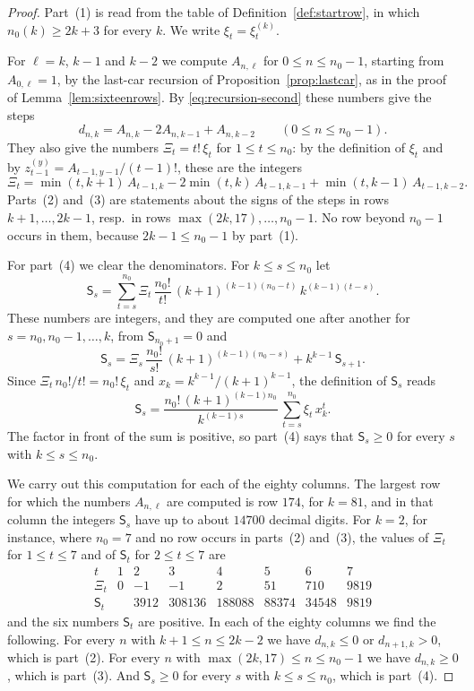 \documentclass{amsart}
\theoremstyle{definition}
\theoremstyle{remark}
\numberwithin{equation}{section}
\begin{document}
\begin{proof}
Part~(1) is read from the table of Definition~\ref{def:startrow}, in which $n_0(k)\ge 2k+3$ for every $k$. We write $\xi_t=\xi^{(k)}_t$.

For $\ell=k$, $k-1$ and $k-2$ we compute $A_{n,\ell}$ for $0\le n\le n_0-1$, starting from $A_{0,\ell}=1$, by the last-car recursion of Proposition~\ref{prop:lastcar}, as in the proof of Lemma~\ref{lem:sixteenrows}. By \eqref{eq:recursion-second} these numbers give the steps
\[
d_{n,k}=A_{n,k}-2A_{n,k-1}+A_{n,k-2}\qquad(0\le n\le n_0-1).
\]
They also give the numbers $\Xi_t=t!\,\xi_t$ for $1\le t\le n_0$: by the definition of $\xi_t$ and by $z^{(y)}_{t-1}=A_{t-1,y-1}/(t-1)!$, these are the integers
\[
\Xi_t=\min(t,k+1)\,A_{t-1,k}-2\min(t,k)\,A_{t-1,k-1}+\min(t,k-1)\,A_{t-1,k-2}.
\]
Parts~(2) and~(3) are statements about the signs of the steps in rows $k+1,\dots,2k-1$, resp.\ in rows $\max(2k,17),\dots,n_0-1$. No row beyond $n_0-1$ occurs in them, because $2k-1\le n_0-1$ by part~(1).

For part~(4) we clear the denominators. For $k\le s\le n_0$ let
\[
\mathsf{S}_s=\sum_{t=s}^{n_0}\Xi_t\,\frac{n_0!}{t!}\,(k+1)^{(k-1)(n_0-t)}\,k^{(k-1)(t-s)}.
\]
These numbers are integers, and they are computed one after another for $s=n_0,n_0-1,\dots,k$, from $\mathsf{S}_{n_0+1}=0$ and
\[
\mathsf{S}_s=\Xi_s\,\frac{n_0!}{s!}\,(k+1)^{(k-1)(n_0-s)}+k^{k-1}\,\mathsf{S}_{s+1}.
\]
Since $\Xi_t\,n_0!/t!=n_0!\,\xi_t$ and $x_k=k^{k-1}/(k+1)^{k-1}$, the definition of $\mathsf{S}_s$ reads
\[
\mathsf{S}_s=\frac{n_0!\,(k+1)^{(k-1)n_0}}{k^{(k-1)s}}\,\sum_{t=s}^{n_0}\xi_t\,x_k^{t}.
\]
The factor in front of the sum is positive, so part~(4) says that $\mathsf{S}_s\ge 0$ for every $s$ with $k\le s\le n_0$.

We carry out this computation for each of the eighty columns. The largest row for which the numbers $A_{n,\ell}$ are computed is row $174$, for $k=81$, and in that column the integers $\mathsf{S}_s$ have up to about $14700$ decimal digits. For $k=2$, for instance, where $n_0=7$ and no row occurs in parts~(2) and~(3), the values of $\Xi_t$ for $1\le t\le 7$ and of $\mathsf{S}_t$ for $2\le t\le 7$ are
\[
\begin{array}{c|rrrrrrr}
t & 1 & 2 & 3 & 4 & 5 & 6 & 7\\ \hline
\Xi_t & 0 & -1 & -1 & 2 & 51 & 710 & 9819\\
\mathsf{S}_t & & 3912 & 308136 & 188088 & 88374 & 34548 & 9819
\end{array}
\]
and the six numbers $\mathsf{S}_t$ are positive. In each of the eighty columns we find the following. For every $n$ with $k+1\le n\le 2k-2$ we have $d_{n,k}\le 0$ or $d_{n+1,k}>0$, which is part~(2). For every $n$ with $\max(2k,17)\le n\le n_0-1$ we have $d_{n,k}\ge 0$, which is part~(3). And $\mathsf{S}_s\ge 0$ for every $s$ with $k\le s\le n_0$, which is part~(4).
\end{proof}
\end{document}
